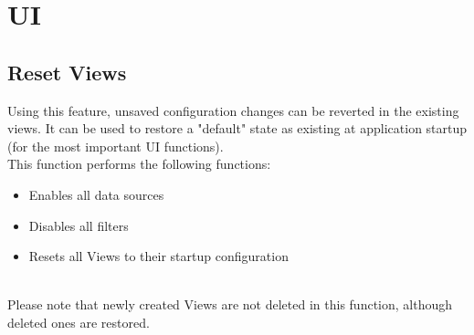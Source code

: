 \section{UI}
 
\subsection{Reset Views}
\label{sec:ui_reset_views}

Using this feature, unsaved configuration changes can be reverted in the existing views. It can be used to restore a "default" state as existing at application startup (for the most important UI functions). \\

This function performs the following functions:
\begin{itemize}
 \item Enables all data sources
 \item Disables all filters
 \item Resets all Views to their startup configuration
\end{itemize}
\  \\

Please note that newly created Views are not deleted in this function, although deleted ones are restored.
